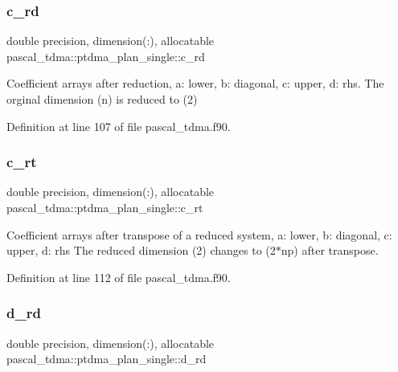 \subsubsection{\texorpdfstring{c\_rd}{c\_rd}}
{\footnotesize\ttfamily double precision, dimension(\+:), allocatable pascal\+\_\+tdma\+::ptdma\+\_\+plan\+\_\+single\+::c\+\_\+rd}



Coefficient arrays after reduction, a\+: lower, b\+: diagonal, c\+: upper, d\+: rhs. The orginal dimension (n) is reduced to (2) 



Definition at line 107 of file pascal\+\_\+tdma.\+f90.

\mbox{\label{structpascal__tdma_1_1ptdma__plan__single_a7169b89281236696ea6eb5631ce44d95}} 
\subsubsection{\texorpdfstring{c\_rt}{c\_rt}}
{\footnotesize\ttfamily double precision, dimension(\+:), allocatable pascal\+\_\+tdma\+::ptdma\+\_\+plan\+\_\+single\+::c\+\_\+rt}



Coefficient arrays after transpose of a reduced system, a\+: lower, b\+: diagonal, c\+: upper, d\+: rhs The reduced dimension (2) changes to (2$\ast$np) after transpose. 



Definition at line 112 of file pascal\+\_\+tdma.\+f90.

\mbox{\label{structpascal__tdma_1_1ptdma__plan__single_a8b99edaa7ecd71fe6ceafd9c69d9a374}} 
\subsubsection{\texorpdfstring{d\_rd}{d\_rd}}
{\footnotesize\ttfamily double precision, dimension(\+:), allocatable pascal\+\_\+tdma\+::ptdma\+\_\+plan\+\_\+single\+::d\+\_\+rd}



